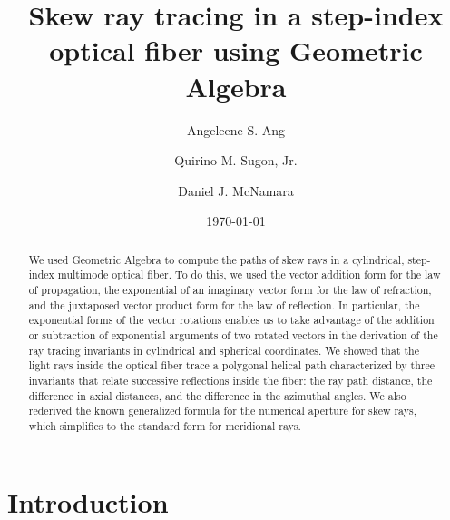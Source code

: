 \documentclass[a4paper,twocolumn,superscriptaddress]{revtex4-1}
\begin{document}
\title{Skew ray tracing in a step-index optical fiber using Geometric Algebra}

\author{Angeleene S. Ang}

\author{Quirino M. Sugon, Jr.}

\author{Daniel J. McNamara}

\begin{abstract}

We used Geometric Algebra to compute the paths of skew rays in a cylindrical, step-index multimode optical fiber. 
To do this, we used the vector addition form for the law of propagation, the exponential of an imaginary vector form for the law of refraction, and the juxtaposed vector product form for the law of reflection. 
In particular, the exponential forms of the vector rotations enables us to take advantage of the addition or subtraction of exponential arguments of two rotated vectors in the derivation of the ray tracing invariants in cylindrical and spherical coordinates. 
We showed that the light rays inside the optical fiber trace a polygonal helical path characterized by three invariants that relate successive reflections inside the fiber: the ray path distance, the difference in axial distances, and the difference in the azimuthal angles. 
We also rederived the known generalized formula for the numerical aperture for skew rays, which simplifies to the standard form for meridional rays.

\end{abstract}

\date{\today}

\maketitle

\section{Introduction} \label{sec:intro}
\end{document}
